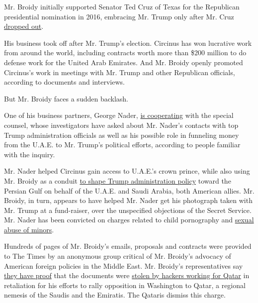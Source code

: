 Mr. Broidy initially supported Senator Ted Cruz of Texas for the
Republican presidential nomination in 2016, embracing Mr. Trump only
after Mr. Cruz
\href{https://www.nytimes.com/2016/05/04/us/politics/ted-cruz.html}{dropped
out}.

His business took off after Mr. Trump's election. Circinus has won
lucrative work from around the world, including contracts worth more
than \$200 million to do defense work for the United Arab Emirates. And
Mr. Broidy openly promoted Circinus's work in meetings with Mr. Trump
and other Republican officials, according to documents and interviews.

But Mr. Broidy faces a sudden backlash.

One of his business partners, George Nader,
\href{https://www.nytimes.com/2018/03/06/us/politics/george-nader-special-counsel-mueller-cooperating-seychelles.html}{is
cooperating} with the special counsel, whose investigators have asked
about Mr. Nader's contacts with top Trump administration officials as
well as his possible role in funneling money from the U.A.E. to Mr.
Trump's political efforts, according to people familiar with the
inquiry.

Mr. Nader helped Circinus gain access to U.A.E.'s crown prince, while
also using Mr. Broidy as a conduit
\href{https://www.nytimes.com/2018/03/21/us/politics/george-nader-elliott-broidy-uae-saudi-arabia-white-house-influence.html}{to
shape Trump administration policy} toward the Persian Gulf on behalf of
the U.A.E. and Saudi Arabia, both American allies. Mr. Broidy, in turn,
appears to have helped Mr. Nader get his photograph taken with Mr. Trump
at a fund-raiser, over the unspecified objections of the Secret Service.
Mr. Nader has been convicted on charges related to child pornography and
\href{http://hosted2.ap.org/PASHA/a5050f4ad4f44dafab85bb41a15281cf/Article_2018-03-15-US-Trump-Russia-Probe/id-93db9ed0b5054340b9acc851355ce56b}{sexual
abuse of minors}.

Hundreds of pages of Mr. Broidy's emails, proposals and contracts were
provided to The Times by an anonymous group critical of Mr. Broidy's
advocacy of American foreign policies in the Middle East. Mr. Broidy's
representatives say
\href{https://assets.documentcloud.org/documents/4417582/Elliott-Broidy-Letter-to-Qatari-Ambassador.pdf}{they
have proof} that the documents were
\href{https://www.nytimes.com/2018/03/05/world/middleeast/qatar-trump-hack-email.html}{stolen
by hackers working for Qatar} in retaliation for his efforts to rally
opposition in Washington to Qatar, a regional nemesis of the Saudis and
the Emiratis. The Qataris dismiss this charge.

